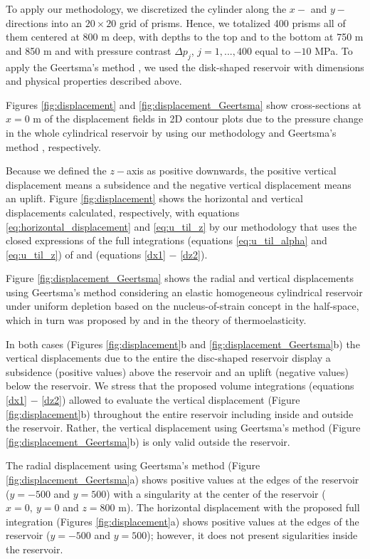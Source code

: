 \documentclass[journal abbreviation, manuscript]{copernicus}
\begin{document}
To apply our methodology, we  discretized the cylinder  along the $x-$ and $y-$ directions into an $20 \times 20$ grid of prisms. Hence, we totalized 400 prisms all of them centered at 800 m deep, with depths to the top and to the bottom at 750 m and 850 m  and with pressure contrast $\Delta p_j$, $j = 1, ..., 400$ equal to $-10$ MPa.
To apply the Geertsma’s method \citep{Geertsma73}, we used the disk-shaped reservoir \citep{Fjaer08} with dimensions and physical properties described above.
 
Figures \ref{fig:displacement}  and \ref{fig:displacement_Geertsma}  show cross-sections at 
$x  = 0$ m of the displacement fields in 2D contour plots  due to the pressure change in the whole  cylindrical reservoir by using our methodology and Geertsma’s method \citep{Geertsma73}, respectively.

Because we defined the $z-$axis as positive downwards, the positive vertical displacement means a subsidence and the negative vertical displacement means an uplift.
Figure \ref{fig:displacement}  shows the horizontal and vertical displacements  calculated, respectively, with equations \ref{eq:horizontal_displacement} and \ref{eq:u_til_z} by our methodology that uses the closed expressions of the full integrations (equations \ref{eq:u_til_alpha} and \ref{eq:u_til_z}) of \cite{Nagyetal2000} and \cite{Nagyetal2002} (equations \ref{dx1} $-$ \ref{dz2}).

Figure \ref{fig:displacement_Geertsma} shows the radial and vertical displacements using Geertsma’s method \citep{Geertsma73}  considering an elastic homogeneous cylindrical reservoir under uniform depletion based on the nucleus-of-strain concept in the half-space, which in turn was proposed by \cite{Mindlin&Cheng50} and \cite{Sen51} in the theory of thermoelasticity.

In both cases (Figures \ref{fig:displacement}b and \ref{fig:displacement_Geertsma}b) the vertical displacements due to the entire the disc-shaped reservoir display a subsidence (positive values) above the reservoir and an uplift (negative values) below the reservoir.
We stress that the proposed volume integrations  (equations \ref{dx1} $-$ \ref{dz2})  allowed  to evaluate the  vertical displacement (Figure \ref{fig:displacement}b) throughout  the entire reservoir including inside and outside the reservoir.
Rather, the  vertical displacement using Geertsma’s method 
(Figure \ref{fig:displacement_Geertsma}b) is only valid outside the reservoir. 

The radial displacement using Geertsma’s method 
(Figure \ref{fig:displacement_Geertsma}a) shows positive values at the edges of the reservoir ($y= -500$ and $y = 500$) with a singularity at the center of the reservoir 
($x= 0, \: y = 0$ and $z = 800$ m). 
The horizontal displacement with the proposed full integration 
(Figures \ref{fig:displacement}a) shows positive values at the edges of the reservoir ($y= -500$ and $y = 500$); however, it does not present sigularities inside the reservoir.
 
\end{document}

